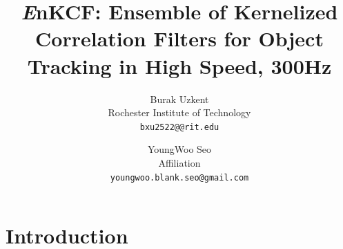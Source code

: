 \documentclass[10pt,twocolumn,letterpaper]{article}
\newcounter{ct}
\begin{document}
\title{ {\it E}nKCF: Ensemble of Kernelized Correlation Filters for Object Tracking in High Speed, 300Hz}

\author{Burak Uzkent\\
Rochester Institute of Technology\\
{\tt\small bxu2522@@rit.edu}
\and
YoungWoo Seo\\
Affiliation\\
{\tt\small youngwoo.blank.seo@gmail.com}
}

\maketitle

\begin{abstract}

\end{abstract}

\section{Introduction}

\end{document}
